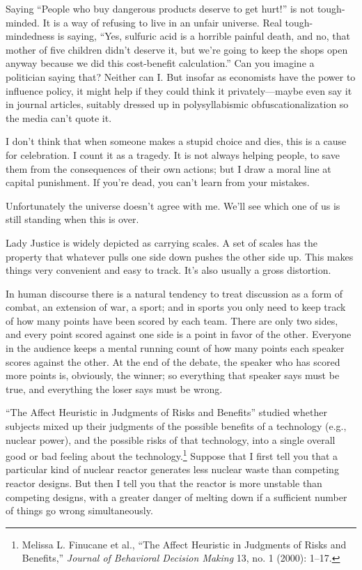{
 Saying ``People who buy dangerous products
deserve to get hurt!'' is not tough-minded. It is a
way of refusing to live in an unfair universe. Real tough-mindedness is
saying, ``Yes, sulfuric acid is a horrible painful
death, and no, that mother of five children didn't
deserve it, but we're going to keep the shops open
anyway because we did this cost-benefit
calculation.'' Can you imagine a politician saying
that? Neither can I. But insofar as economists have the power to
influence policy, it might help if they could think it
privately---maybe even say it in journal articles, suitably dressed up
in polysyllabismic obfuscationalization so the media
can't quote it.}

{
 I don't think that when someone makes a stupid
choice and dies, this is a cause for celebration. I count it as a
tragedy. It is not always helping people, to save them from the
consequences of their own actions; but I draw a moral line at capital
punishment. If you're dead, you can't
learn from your mistakes.}

{
 Unfortunately the universe doesn't agree with me.
We'll see which one of us is still standing when this
is over.}

\myendsectiontext


{
 Lady Justice is widely depicted as carrying scales. A set of
scales has the property that whatever pulls one side down pushes the
other side up. This makes things very convenient and easy to track.
It's also usually a gross distortion. }

{
 In human discourse there is a natural tendency to treat discussion
as a form of combat, an extension of war, a sport; and in sports you
only need to keep track of how many points have been scored by each
team. There are only two sides, and every point scored against one side
is a point in favor of the other. Everyone in the audience keeps a
mental running count of how many points each speaker scores against the
other. At the end of the debate, the speaker who has scored more points
is, obviously, the winner; so everything that speaker says must be
true, and everything the loser says must be wrong.}

{
 ``The Affect Heuristic in Judgments of Risks and
Benefits'' studied whether subjects mixed up their
judgments of the possible benefits of a technology (e.g., nuclear
power), and the possible risks of that technology, into a single
overall good or bad feeling about the technology.\footnote{Melissa L. Finucane et al., ``The Affect
Heuristic in Judgments of Risks and Benefits,''
\textit{Journal of Behavioral Decision Making} 13, no. 1 (2000):
1--17.}
Suppose that I first tell you that a particular kind of nuclear reactor
generates less nuclear waste than competing reactor designs. But then I
tell you that the reactor is more unstable than competing designs, with
a greater danger of melting down if a sufficient number of things go
wrong simultaneously.}

